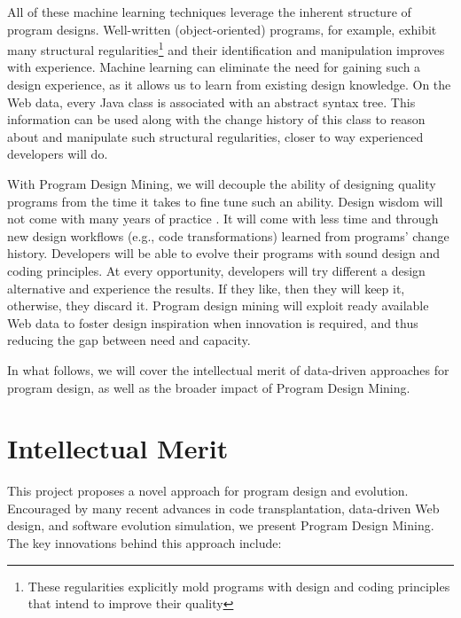 All of these machine learning techniques leverage the inherent structure of 
program designs. Well-written (object-oriented) programs, for example, exhibit 
many structural regularities\footnote{These regularities explicitly mold programs with design 
and coding principles that intend to improve their quality} and their identification and manipulation 
improves with experience. Machine learning can eliminate the need for gaining 
such a design experience, as it allows us to learn from existing design knowledge. 
On the Web data, every Java class is associated with an abstract syntax tree. 
This information can be used along with the change history of this class to reason 
about and manipulate such structural regularities, closer to way experienced 
developers will do. 

With Program Design Mining, we will decouple the ability of designing quality 
programs from the time it takes to fine tune such an ability. Design wisdom 
will not come with many years of practice \cite{weiser1983programming, 
winslow1996programming}. It will come with less time and through new design 
workflows (e.g., code transformations) learned from programs' change 
history. Developers will be able to evolve their programs with sound design and 
coding principles. At every opportunity, developers will try different a design 
alternative and experience the results. If they like, then they will keep it, 
otherwise, they discard it. Program design mining will exploit ready available 
Web data to foster design inspiration when innovation is required, and thus 
reducing the gap between need and capacity.

In what follows, we will cover the intellectual merit of data-driven 
approaches for program design, as well as the broader impact of Program 
Design Mining.

\section*{Intellectual Merit} %
\label{sec:merit}

This project proposes a novel approach for program design and 
evolution. Encouraged by many recent advances in code transplantation, 
data-driven Web design, and software evolution simulation, we 
present Program Design Mining. The key innovations behind this 
approach include:

